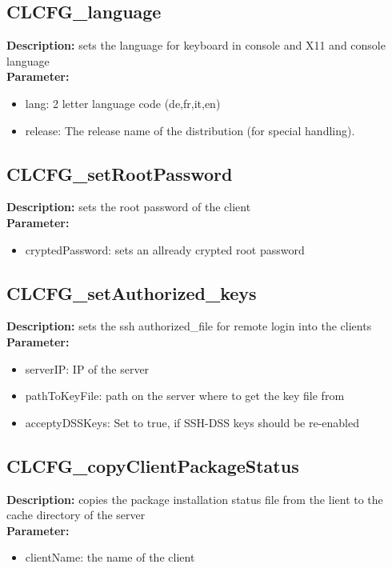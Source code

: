 \subsection{CLCFG\_language}
\textbf{Description:} sets the language for keyboard in console and X11 and console language\\
\textbf{Parameter:}
\begin{itemize}
\item lang: 2 letter language code (de,fr,it,en)
\item release: The release name of the distribution (for special handling).
\end{itemize}

\subsection{CLCFG\_setRootPassword}
\textbf{Description:} sets the root password of the client\\
\textbf{Parameter:}
\begin{itemize}
\item cryptedPassword: sets an allready crypted root password
\end{itemize}

\subsection{CLCFG\_setAuthorized\_keys}
\textbf{Description:} sets the ssh authorized\_file for remote login into the clients\\
\textbf{Parameter:}
\begin{itemize}
\item serverIP: IP of the server
\item pathToKeyFile: path on the server where to get the key file from
\item acceptyDSSKeys: Set to true, if SSH-DSS keys should be re-enabled
\end{itemize}

\subsection{CLCFG\_copyClientPackageStatus}
\textbf{Description:} copies the package installation status file from the lient to the cache directory of the server\\
\textbf{Parameter:}
\begin{itemize}
\item clientName: the name of the client
\end{itemize}

